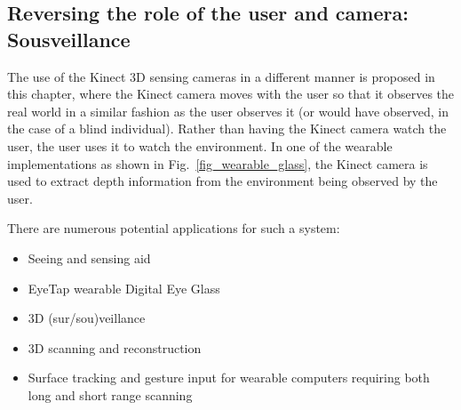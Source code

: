 \subsection{Reversing the role of the user and camera: Sousveillance}
The use of the Kinect 3D sensing cameras in a different manner is proposed in this chapter, where 
the Kinect camera moves with the user so that it observes the real world in a similar fashion as the 
user observes it (or would have observed, in the case of a blind individual). Rather than having the 
Kinect camera watch the user, the user uses it to watch the environment. In one of the wearable 
implementations as shown in Fig.~\ref{fig_wearable_glass}, the Kinect camera is used to extract 
depth information from the environment being observed by the user.

There are numerous potential applications for such a system:
\begin{itemize}
\item Seeing and sensing aid \cite{mann2011blind}
\item EyeTap wearable Digital Eye Glass \cite{lo2012high, mann2012hdrchitecture, mann2012realtime}
\item 3D (sur/sou)veillance 
\item 3D scanning and reconstruction \cite{izadi2011kinectfusion}
\item Surface tracking and gesture input for wearable computers requiring both long and short range scanning
\end{itemize}

